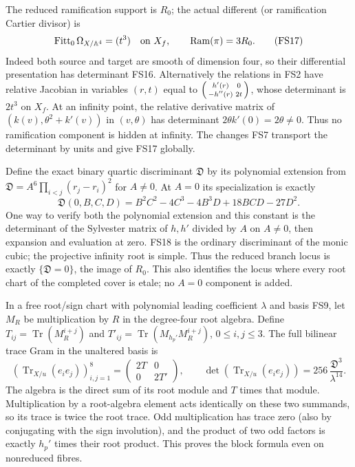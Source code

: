 \documentclass[11pt]{article}
\providecommand{\Tr}{\operatorname{Tr}}
\providecommand{\Tr}{\operatorname{Tr}}
\begin{document}
The reduced ramification support is $R_0$; the actual
different (or ramification Cartier divisor) is
\begin{equation}
\operatorname{Fitt}_0\Omega_{X/\mathbb A^4}
=(t^3)\quad\hbox{on }X_f,\qquad
\operatorname{Ram}(\pi)=3R_0 .
\tag{FS17}
\end{equation}
Indeed both source and target are smooth of dimension four,
so their differential presentation has determinant FS16.
Alternatively the relations in FS2 have relative Jacobian
in variables $(r,t)$ equal to
$\begin{psmallmatrix}h'(r)&0\\-h''(r)&2t\end{psmallmatrix}$,
whose determinant is $2t^3$ on $X_f$.
At an infinity point, the relative derivative matrix of
$(k(v),\theta^2+k'(v))$ in $(v,\theta)$ has determinant
$2\theta k'(0)=2\theta\ne0$.
Thus no ramification component is hidden at infinity.
The changes FS7 transport the determinant by units and
give FS17 globally.

Define the exact binary quartic discriminant $\mathfrak D$
by its polynomial extension from
$\mathfrak D=A^6\prod_{i<j}(r_j-r_i)^2$ for $A\ne0$.
At $A=0$ its specialization is exactly
\begin{equation}
\mathfrak D(0,B,C,D)
=B^2C^2-4C^3-4B^3D+18BCD-27D^2.
\tag{FS18}
\end{equation}
One way to verify both the polynomial extension and this
constant is the determinant of the Sylvester matrix of
$h,h'$ divided by $A$ on $A\ne0$, then expansion and
evaluation at zero. FS18 is the ordinary discriminant of
the monic cubic; the projective infinity root is simple.
Thus the reduced branch locus is exactly
$\{\mathfrak D=0\}$, the image of $R_0$.
This also identifies the locus where every root chart of
the completed cover is etale; no $A=0$ component is added.

In a free root/sign chart with polynomial leading coefficient
$\lambda$ and basis FS9, let $M_R$ be multiplication by $R$
in the degree-four root algebra. Define
$T_{ij}=\Tr(M_R^{i+j})$ and
$T'_{ij}=\Tr(M_{h_p'}M_R^{i+j})$, $0\le i,j\le3$.
The full bilinear trace Gram in the unaltered basis is
\begin{equation}
\left(\Tr_{X/u}(e_ie_j)\right)_{i,j=1}^{8}
=\begin{pmatrix}2T&0\\0&2T'\end{pmatrix},\qquad
\det\left(\Tr_{X/u}(e_ie_j)\right)
=256\,\frac{\mathfrak D^3}{\lambda^{14}} .
\tag{FS19}
\end{equation}
The algebra is the direct sum of its root module and $T$
times that module. Multiplication by a root-algebra element
acts identically on these two summands, so its trace is twice
the root trace. Odd multiplication has trace zero (also by
conjugating with the sign involution), and the product of
two odd factors is exactly $h_p'$ times their root product.
This proves the block formula even on nonreduced fibres.
\end{document}

